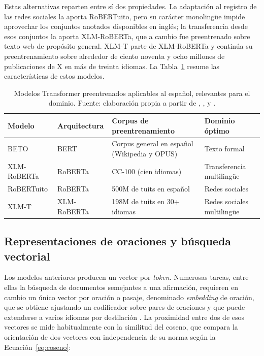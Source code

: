 Estas alternativas reparten entre sí dos propiedades. La adaptación al registro de las redes sociales la aporta RoBERTuito, pero su carácter monolingüe impide aprovechar los conjuntos anotados disponibles en inglés; la transferencia desde esos conjuntos la aporta XLM-RoBERTa, que a cambio fue preentrenado sobre texto web de propósito general. XLM-T \parencite{BarbieriEtAl2022} parte de XLM-RoBERTa y continúa su preentrenamiento sobre alrededor de ciento noventa y ocho millones de publicaciones de X en más de treinta idiomas. La Tabla~\ref{tab:modelos-espanol} resume las características de estos modelos.

\begin{table}[t]
  \centering
  \caption{Modelos Transformer preentrenados aplicables al español, relevantes para el dominio. Fuente: elaboración propia a partir de \textcite{CañeteEtAl2020}, \textcite{ConneauEtAl2020}, \textcite{PerezEtAl2022} y \textcite{BarbieriEtAl2022}.}
  \label{tab:modelos-espanol}
  \small
  \begin{tabular}{l l l l}
    \hline
    \textbf{Modelo} & \textbf{Arquitectura} & \textbf{Corpus de preentrenamiento} & \textbf{Dominio óptimo} \\
    \hline
    BETO & BERT & Corpus general en español (Wikipedia y OPUS) & Texto formal \\
    XLM-RoBERTa & RoBERTa & CC-100 (cien idiomas) & Transferencia multilingüe \\
    RoBERTuito & RoBERTa & 500M de tuits en español & Redes sociales \\
    XLM-T & XLM-RoBERTa & 198M de tuits en 30+ idiomas & Redes sociales multilingüe \\
    \hline
  \end{tabular}
\end{table}

\subsection{Representaciones de oraciones y búsqueda vectorial}
\label{sec:busqueda-vectorial}

Los modelos anteriores producen un vector por \textit{token}. Numerosas tareas, entre ellas la búsqueda de documentos semejantes a una afirmación, requieren en cambio un único vector por oración o pasaje, denominado \textit{embedding} de oración, que se obtiene ajustando un codificador sobre pares de oraciones y que puede extenderse a varios idiomas por destilación \parencite{ReimersGurevych2020}. La proximidad entre dos de esos vectores se mide habitualmente con la similitud del coseno, que compara la orientación de dos vectores con independencia de su norma según la Ecuación~\ref{eq:coseno}:

